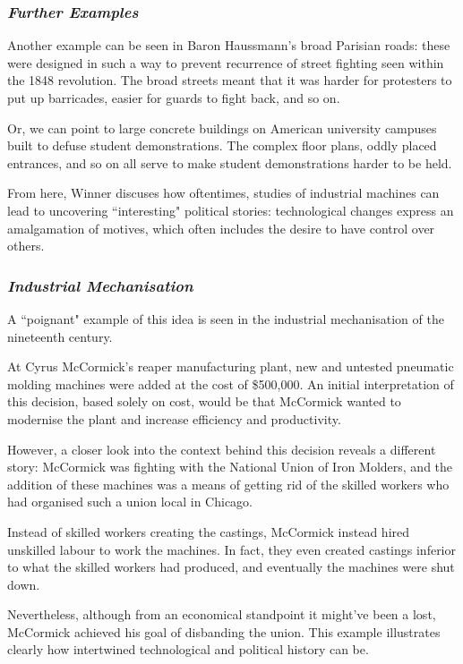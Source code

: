\documentclass[openany]{book}
\begin{document}
\subsubsection{\textit{Further Examples}}
\begin{example}
	Another example can be seen in Baron Haussmann's broad Parisian roads: these were designed in such a way to prevent recurrence of street fighting seen within the 1848 revolution. The broad streets meant that it was harder for protesters to put up barricades, easier for guards to fight back, and so on.
\end{example}

\begin{example}
	Or, we can point to large concrete buildings on American university campuses built to defuse student demonstrations. The complex floor plans, oddly placed entrances, and so on all serve to make student demonstrations harder to be held\footnotemark.
\end{example}

From here, Winner discuses how oftentimes, studies of industrial machines can lead to uncovering ``interesting" political stories: technological changes express an amalgamation of motives, which often includes the desire to have control over others.

\subsubsection{\textit{Industrial Mechanisation}}
\begin{example}
	A ``poignant" example of this idea is seen in the industrial mechanisation of the nineteenth century.
	
	At Cyrus McCormick's reaper manufacturing plant, new and untested pneumatic molding machines were added at the cost of \$500,000. An initial interpretation of this decision, based solely on cost, would be that McCormick wanted to modernise the plant and increase efficiency and productivity.
	
	However, a closer look into the context behind this decision reveals a different story: McCormick was fighting with the National Union of Iron Molders, and the addition of these machines was a means of getting rid of the skilled workers who had organised such a union local in Chicago.
	
	Instead of skilled workers creating the castings, McCormick instead hired unskilled labour to work the machines. In fact, they even created castings inferior to what the skilled workers had produced, and eventually the machines were shut down.
	
	Nevertheless, although from an economical standpoint it might've been a lost, McCormick achieved his goal of disbanding the union. This example illustrates clearly how intertwined technological and political history can be.
\end{example}
\end{document}
